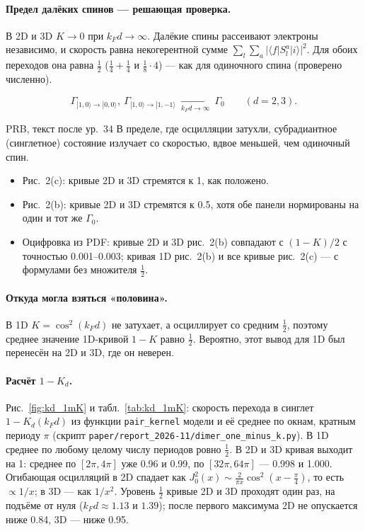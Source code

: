 \paragraph{Предел далёких спинов --- решающая проверка.} В 2D и 3D $K\to0$ при
$k_Fd\to\infty$. Далёкие спины рассеивают электроны независимо, и скорость
равна некогерентной сумме $\sum_l\sum_a|\langle f|S^a_l|i\rangle|^2$. Для обоих
переходов она равна $\tfrac12$ ($\tfrac14+\tfrac14$ и $\tfrac18\cdot4$) --- как для одиночного спина
(проверено численно).
\begin{resbox}
\[
\Gamma_{|1,0\rangle\to|0,0\rangle},\ \Gamma_{|1,0\rangle\to|1,-1\rangle}\ \xrightarrow[k_Fd\to\infty]{}\ \Gamma_0\qquad(d=2,3).
\]
\end{resbox}
\begin{paperbox}{PRB, текст после ур.~34}
В пределе, где осцилляции затухли, субрадиантное (синглетное) состояние
излучает со скоростью, вдвое меньшей, чем одиночный спин.
\end{paperbox}
\begin{cmpbox}
\begin{itemize}
\item Рис.~2(c): кривые 2D и 3D стремятся к 1, как положено.
\item Рис.~2(b): кривые 2D и 3D стремятся к 0.5, хотя обе панели нормированы
  на один и тот же $\Gamma_0$.
\item Оцифровка из PDF: кривые 2D и 3D рис.~2(b) совпадают с $(1-K)/2$ с
  точностью 0.001--0.003; кривая 1D рис.~2(b) и все кривые рис.~2(c) --- с
  формулами без множителя $\tfrac12$.
\end{itemize}
\end{cmpbox}

\paragraph{Откуда могла взяться «половина».} В 1D $K=\cos^2(k_Fd)$ не затухает, а
осциллирует со средним $\tfrac12$, поэтому среднее значение 1D-кривой $1-K$ равно
$\tfrac12$. Вероятно, этот вывод для 1D был перенесён на 2D и 3D, где он неверен.

\paragraph{Расчёт $1-K_d$.} Рис.~\ref{fig:kd_1mK} и табл.~\ref{tab:kd_1mK}: скорость
перехода в синглет $1-K_d(k_Fd)$ из функции \texttt{pair\_kernel} модели и её среднее
по окнам, кратным периоду $\pi$ (скрипт \texttt{paper/report\_2026-11/dimer\_one\_minus\_k.py}).
В 1D среднее по любому целому числу периодов ровно $\tfrac12$. В 2D и 3D кривая
выходит на 1: среднее по $[2\pi,4\pi]$ уже 0.96 и 0.99, по $[32\pi,64\pi]$ --- 0.998 и 1.000.
Огибающая осцилляций в 2D спадает как $J_0^2(x)\sim\frac{2}{\pi x}\cos^2(x-\tfrac\pi4)$, то есть
$\propto1/x$; в 3D --- как $1/x^2$. Уровень $\tfrac12$ кривые 2D и 3D проходят один раз,
на подъёме от нуля ($k_Fd\approx1.13$ и $1.39$); после первого максимума 2D не опускается
ниже 0.84, 3D --- ниже 0.95.

